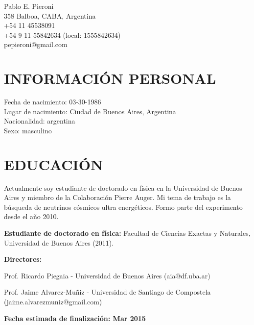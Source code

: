 \documentclass[letterpaper]{article}
\def\name{Pablo E. Pieroni}
\renewenvironment{itemize}{
  \begin{list}{}{
    \setlength{\leftmargin}{1.5em}
  }
}{
  \end{list}
}
\begin{document}
\begin{flushright}
{\huge \name}\\
   358 Balboa, CABA, Argentina\\
   +54 11 45538091 \\
   +54 9 11 55842634 (local: 1555842634)\\
   pepieroni@gmail.com
\end{flushright}

\vspace{0.25in}

\section*{INFORMACIÓN PERSONAL}
   Fecha de nacimiento: 03-30-1986\\
   Lugar de nacimiento: Ciudad de Buenos Aires, Argentina\\
   Nacionalidad: argentina\\
   Sexo: masculino
 
\section*{EDUCACIÓN}
Actualmente soy estudiante de doctorado en física en la Universidad de Buenos Aires y miembro de la Colaboración Pierre Auger. 
Mi tema de trabajo es la búsqueda de neutrinos cósmicos ultra energéticos. 
Formo parte del experimento desde el año 2010.
\begin{itemize}
 \item \textbf{Estudiante de doctorado en física:} Facultad de Ciencias Exactas y Naturales, Universidad de Buenos Aires (2011).
 \item \textbf{Directores:}
 \begin{itemize}
  \item Prof. Ricardo Piegaia - Universidad de Buenos Aires (aia@df.uba.ar) 
  \item Prof. Jaime Alvarez-Mu\~niz - Universidad de Santiago de Compostela (jaime.alvarezmuniz@gmail.com)
 \end{itemize}
 \item \textbf{Fecha estimada de finalización: Mar 2015}
\end{itemize}
 
\end{document}
